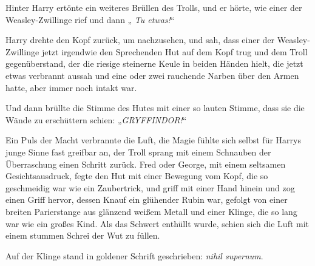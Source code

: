 Hinter Harry ertönte ein weiteres Brüllen des Trolls, und er hörte, wie einer der Weasley-Zwillinge  rief und dann „\emph{ Tu etwas!}“

Harry drehte den Kopf zurück, um nachzusehen, und sah, dass einer der Weasley-Zwillinge jetzt irgendwie den Sprechenden Hut auf dem Kopf trug und dem Troll gegenüberstand, der die riesige steinerne Keule in beiden Händen hielt, die jetzt etwas verbrannt aussah und eine oder zwei rauchende Narben über den Armen hatte, aber immer noch intakt war.

Und dann brüllte die Stimme des Hutes mit einer so lauten Stimme, dass sie die Wände zu erschüttern schien: „\emph{GRYFFINDOR!}“

Ein Puls der Macht verbrannte die Luft, die Magie fühlte sich selbst für Harrys junge Sinne fast greifbar an, der Troll sprang mit einem Schnauben der Überraschung einen Schritt zurück. Fred oder George, mit einem seltsamen Gesichtsausdruck, fegte den Hut mit einer Bewegung vom Kopf, die so geschmeidig war wie ein Zaubertrick, und griff mit einer Hand hinein und zog einen Griff hervor, dessen Knauf ein glühender Rubin war, gefolgt von einer breiten Parierstange aus glänzend weißem Metall und einer Klinge, die so lang war wie ein großes Kind. Als das Schwert enthüllt wurde, schien sich die Luft mit einem stummen Schrei der Wut zu füllen.

Auf der Klinge stand in goldener Schrift geschrieben: \emph{nihil supernum}.

